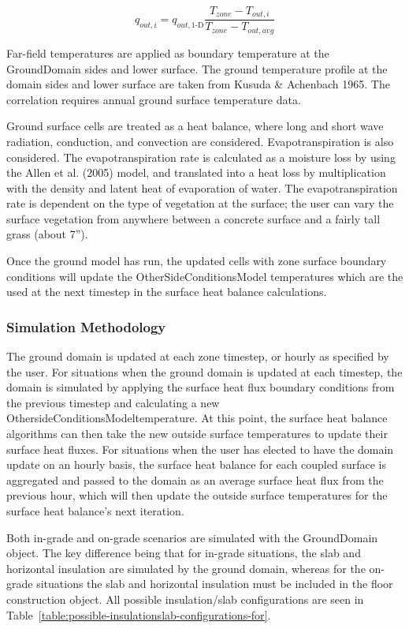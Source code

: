 \begin{equation}
	q_{out,i} = q_{out,\mbox{1-D}} \frac{T_{zone} - T_{out,i}}{T_{zone} - T_{out,avg}}
	\label{eq:Pinel-Beausoleil-Morrison}
\end{equation}


Far-field temperatures are applied as boundary temperature at the GroundDomain sides and lower surface. The ground temperature profile at the domain sides and lower surface are taken from Kusuda \& Achenbach 1965. The correlation requires annual ground surface temperature data.

Ground surface cells are treated as a heat balance, where long and short wave radiation, conduction, and convection are considered. Evapotranspiration is also considered. The evapotranspiration rate is calculated as a moisture loss by using the Allen et al. (2005) model, and translated into a heat loss by multiplication with the density and latent heat of evaporation of water. The evapotranspiration rate is dependent on the type of vegetation at the surface; the user can vary the surface vegetation from anywhere between a concrete surface and a fairly tall grass (about 7'').

Once the ground model has run, the updated cells with zone surface boundary conditions will update the OtherSideConditionsModel temperatures which are the used at the next timestep in the surface heat balance calculations.

\subsubsection{Simulation Methodology}\label{simulation-methodology-000}

The ground domain is updated at each zone timestep, or hourly as specified by the user. For situations when the ground domain is updated at each timestep, the domain is simulated by applying the surface heat flux boundary conditions from the previous timestep and calculating a new OthersideConditionsModeltemperature. At this point, the surface heat balance algorithms can then take the new outside surface temperatures to update their surface heat fluxes. For situations when the user has elected to have the domain update on an hourly basis, the surface heat balance for each coupled surface is aggregated and passed to the domain as an average surface heat flux from the previous hour, which will then update the outside surface temperatures for the surface heat balance's next iteration.

Both in-grade and on-grade scenarios are simulated with the GroundDomain object. The key difference being that for in-grade situations, the slab and horizontal insulation are simulated by the ground domain, whereas for the on-grade situations the slab and horizontal insulation must be included in the floor construction object. All possible insulation/slab configurations are seen in Table~\ref{table:possible-insulationslab-configurations-for}.

